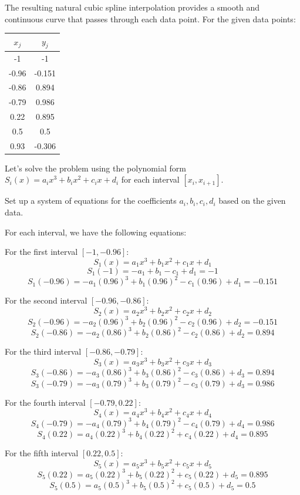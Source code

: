 \documentclass[12pt, a4paper]{article}
\numberwithin{equation}{section}
\begin{document}
The resulting natural cubic spline interpolation provides a smooth and continuous curve that passes through each data point.
For the given data points:

\begin{table}[!ht]
    \centering
    \begin{tabular}{cc}
    \hline
        $x_j$ & $y_j$ \\ \hline
        -1 & -1 \\ 
        -0.96 & -0.151 \\ 
        -0.86 & 0.894 \\ 
        -0.79 & 0.986 \\ 
        0.22 & 0.895 \\ 
        0.5 & 0.5 \\ 
        0.93 & -0.306 \\ \hline
    \end{tabular}
\end{table}


Let's solve the problem using the polynomial form \(S_i(x) = a_ix^3 + b_ix^2 + c_ix + d_i\) for each interval \([x_i, x_{i+1}]\).


Set up a system of equations for the coefficients \(a_i, b_i, c_i, d_i\) based on the given data.

For each interval, we have the following equations:

For the first interval \([-1, -0.96]\):
\[S_1(x) = a_1x^3 + b_1x^2 + c_1x + d_1\]
\[S_1(-1) = -a_1 + b_1 - c_1 + d_1 = -1\]
\[S_1(-0.96) = -a_1(0.96)^3 + b_1(0.96)^2 - c_1(0.96) + d_1 = -0.151\]

For the second interval \([-0.96, -0.86]\):
\[S_2(x) = a_2x^3 + b_2x^2 + c_2x + d_2\]
\[S_2(-0.96) = -a_2(0.96)^3 + b_2(0.96)^2 - c_2(0.96) + d_2 = -0.151\]
\[S_2(-0.86) = -a_2(0.86)^3 + b_2(0.86)^2 - c_2(0.86) + d_2 = 0.894\]

For the third interval \([-0.86, -0.79]\):
\[S_3(x) = a_3x^3 + b_3x^2 + c_3x + d_3\]
\[S_3(-0.86) = -a_3(0.86)^3 + b_3(0.86)^2 - c_3(0.86) + d_3 = 0.894\]
\[S_3(-0.79) = -a_3(0.79)^3 + b_3(0.79)^2 - c_3(0.79) + d_3 = 0.986\]

For the fourth interval \([-0.79, 0.22]\):
\[S_4(x) = a_4x^3 + b_4x^2 + c_4x + d_4\]
\[S_4(-0.79) = -a_4(0.79)^3 + b_4(0.79)^2 - c_4(0.79) + d_4 = 0.986\]
\[S_4(0.22) = a_4(0.22)^3 + b_4(0.22)^2 + c_4(0.22) + d_4 = 0.895\]

For the fifth interval \([0.22, 0.5]\):
\[S_5(x) = a_5x^3 + b_5x^2 + c_5x + d_5\]
\[S_5(0.22) = a_5(0.22)^3 + b_5(0.22)^2 + c_5(0.22) + d_5 = 0.895\]
\[S_5(0.5) = a_5(0.5)^3 + b_5(0.5)^2 + c_5(0.5) + d_5 = 0.5\]
\end{document}
